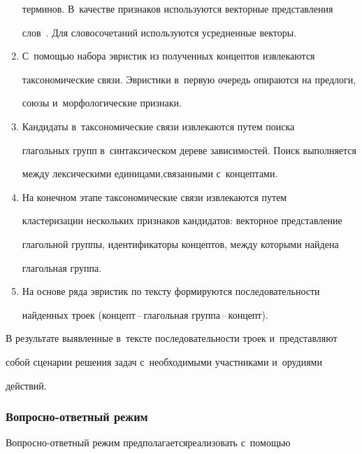 \begin{multicols}{2}
\begin{enumerate}[1.]
терминов. В~качестве признаков используются векторные пред\-став\-ле\-ния 


слов~\cite{8-sm}. Для словосочетаний используются усредненные векторы.


  \item С~помощью набора эвристик из полученных концептов извлекаются 


таксономические связи. Эвристики в~первую очередь опираются на предлоги, 


союзы и~морфологические признаки.


\item Кандидаты в~таксономические связи извлекаются путем поиска 


глагольных групп в~синтаксическом дереве зависимостей. Поиск вы\-полняется 


между лексическими единицами,\linebreak связанными с~концептами.


  \item На конечном этапе таксономические связи извлекаются путем 


кластеризации нескольких признаков кандидатов: векторное представление 


глагольной группы, идентификаторы концептов, между которыми найдена 


глагольная группа.


  \item  На основе ряда эвристик по тексту формируются последовательности 


найденных троек (кон\-цепт\,--\,гла\-голь\-ная груп\-па\,--\,кон\-цепт).


  \end{enumerate}


  


  В результате выявленные в~тексте последовательности троек и~представляют 


собой сценарии решения задач с~необходимыми участниками и~орудиями 


действий.


  


  \subsubsection{Вопросно-ответный режим} %


  


  Вопросно-ответный режим предполагается\linebreak реализовать с~помощью 



\end{multicols}
